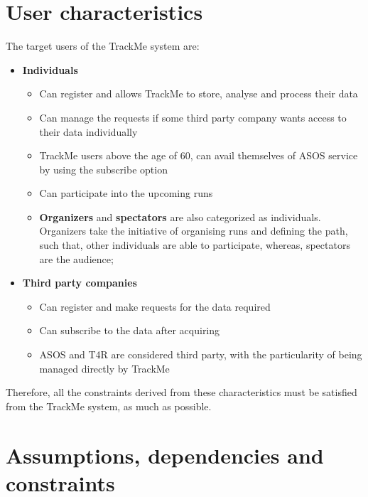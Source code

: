\documentclass[hidelinks, 12pt]{report}
\begin{document}
\section{User characteristics}
The target users of the TrackMe system are:
\begin{itemize}
\item{} \textbf{Individuals}
\begin{itemize}
\item{} Can register and allows TrackMe to store, analyse and process their data
\item{} Can manage the requests if some third party company wants access to their data individually
\item{} TrackMe users above the age of 60, can avail themselves of ASOS service by using the subscribe option
\item{} Can participate into the upcoming runs
\item{} \textbf{Organizers} and \textbf{spectators} are also categorized as individuals. Organizers take the initiative of organising runs and defining the path, such that, other individuals are able to participate, whereas, spectators are the audience;

\end{itemize}
\item{} \textbf{Third party companies}
\begin{itemize}
\item{} Can register and make requests for the data required
\item{} Can subscribe to the data after acquiring
\item{} ASOS and T4R are considered third party, with the particularity of being managed directly by TrackMe
\end{itemize}
\end{itemize}

Therefore, all the constraints derived from these characteristics must be satisfied from the TrackMe system, as much as possible.

\section{Assumptions, dependencies and constraints}
\end{document}
